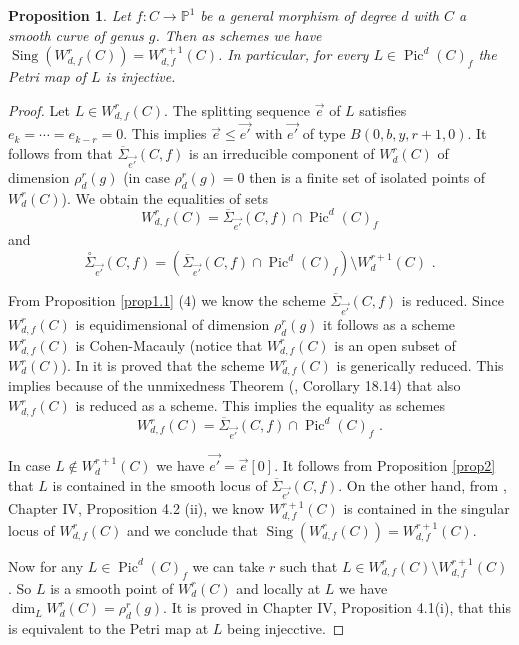 \documentclass{article}
\DeclareMathOperator{\Pic}{Pic}
\DeclareMathOperator{\Sing}{Sing}
\newtheorem{proposition}{Proposition}
\theoremstyle{definition}
\theoremstyle{remark}
\begin{document}
\begin{proposition}\label{prop3}
Let $f :C \rightarrow \mathbb{P}^1$ be a general morphism of degree $d$ with $C$ a smooth curve of genus $g$.
Then as schemes we have $\Sing (W^r_{d,f}(C))=W^{r+1}_{d,f}(C)$.
In particular, for every $L \in \Pic^d(C)_f$ the Petri map of $L$ is injective.
\end{proposition}
\begin{proof}
Let $L \in W^r_{d,f}(C)$.
The splitting sequence $\overrightarrow {e}$ of $L$ satisfies $e_k = \cdots = e_{k-r} = 0$.
This implies $\overrightarrow {e} \leq \overrightarrow {e'}$ with $\overrightarrow {e'}$ of type $B(0,b,y,r+1,0)$.
It follows from \cite{ref7} that  $\overline {\Sigma}_{\overrightarrow {e'}}(C,f)$  is an irreducible component of $W^r_d(C)$ of dimension $\rho^r_d(g)$ (in case $\rho^r_d(g)=0$ then is a finite set of isolated points of $W^r_d(C)$).
We obtain the equalities of sets
\[
W^r_{d,f}(C) = \overline {\Sigma}_{\overrightarrow {e'}}(C,f) \cap \Pic^d(C)_f
\]
and
\[
\overset {\circ}{\Sigma}_{\overrightarrow {e'}}(C,f)=(\overline {\Sigma}_{\overrightarrow {e'}}(C,f) \cap \Pic^d(C)_f) \setminus W^{r+1}_d(C) \text { .}
\]

From Proposition \ref{prop1.1} (4) we know the scheme $\overline {\Sigma}_{\overrightarrow {e'}}(C,f)$ is reduced.
Since $W^r_{d,f}(C)$ is equidimensional of dimension $\rho^r_d(g)$ it follows as a scheme $W^r_{d,f}(C)$ is Cohen-Macauly (notice that $W^r_{d,f}(C)$ is an open subset of $W^r_d(C)$).
In \cite {ref2} it is proved that the scheme $W^r_{d,f}(C)$ is generically reduced.
This implies because of the unmixedness Theorem (\cite {ref5}, Corollary 18.14) that also $W^r_{d,f}(C)$ is reduced as a scheme.
This implies the equality as schemes
\[
W^r_{d,f}(C) = \overline {\Sigma}_{\overrightarrow {e'}}(C,f) \cap \Pic^d(C)_f \text { .}
\]

In case $L \notin W^{r+1}_d(C)$ we have $\overrightarrow {e'}=\overrightarrow {e}[0]$.
It follows from Proposition \ref{prop2} that $L$ is contained in the smooth locus of $\overline{\Sigma}_{\overrightarrow {e'}}(C,f)$.
On the other hand, from \cite{ref9}, Chapter IV, Proposition 4.2 (ii), we know $W^{r+1}_{d,f}(C)$ is contained in the singular locus of $W^r_{d,f}(C)$ and we conclude that $\Sing (W^r_{d,f}(C))=W^{r+1}_{d,f}(C)$.

Now for any $L \in \Pic^d(C)_f$ we can take $r$ such that $L \in W^r_{d,f}(C) \setminus W^{r+1}_{d,f}(C)$.
So $L$ is a smooth point of $W^r_d(C)$ and locally at $L$ we have $\dim _L W^r_d(C)=\rho ^r_d(g)$.
It is proved in \cite {ref9} Chapter IV, Proposition 4.1(i), that this is equivalent to the Petri map at $L$ being injecctive.
\end{proof}
\end{document}
